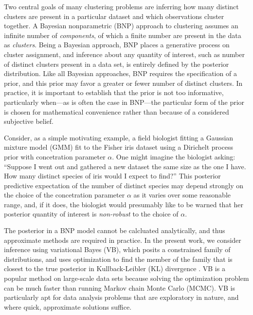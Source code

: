 Two central goals of many clustering problems are inferring how many distinct
clusters are present in a particular dataset and which observations cluster
together. A Bayesian nonparametric (BNP) approach to clustering assumes an
infinite number of \textit{components}, of which a finite number are present in
the data as \textit{clusters}. Being a Bayesian approach, BNP places a
generative process on cluster assignment, and inference about any quantity of
interest, such as number of distinct clusters present in a data set, is entirely
defined by the posterior distribution. Like all Bayesian approaches, BNP
requires the specification of a prior, and this prior may favor a greater or
fewer number of distinct clusters. In practice, it is important to establish
that the prior is not too informative, particularly when---as is often the case
in BNP---the particular form of the prior is chosen for mathematical convenience
rather than because of a considered subjective belief.

Consider, as a simple motivating example, a field biologist fitting a Gaussian
mixture model (GMM) fit to the Fisher iris dataset \citep{anderson:1936:iris,
fisher:1936:iris} using a Dirichelt process prior with concetration parameter
$\alpha$.  One might imagine the biologist asking: ``Suppose I went out and
gathered a new dataset the same size as the one I have.  How many distinct
species of iris would I expect to find?''  This posterior predictive expectation
of the number of distinct species may depend strongly on the choice of the
concetration parameter $\alpha$ as it varies over some reasonable range, and, if
it does, the biologist would presumably like to be warned that her posterior
quantity of interest is {\em non-robust} to the choice of $\alpha$.

The posterior in a BNP model cannot be calcluated analytically, and thus
approximate methods are required in practice. In the present work, we consider
inference using variational Bayes (VB), which posits a constrained family of
distributions, and uses optimization to find the member of the family that is
closest to the true posterior in Kullback-Leibler ($\mathrm{KL}$) divergence
\citep{blei:2017:vi_review, blei:2006:vi_for_dp}. VB is a popular method on
large-scale data sets because solving the optimization problem can be much
faster than running Markov chain Monte Carlo (MCMC). VB is particularly apt for
data analysis problems that are exploratory in nature, and where quick,
approximate solutions suffice.


